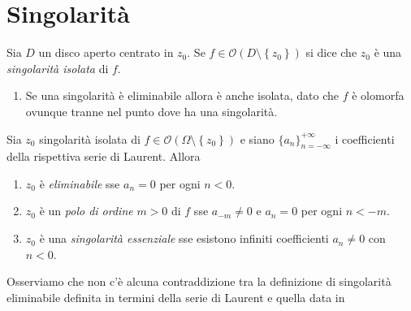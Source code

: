 \section{Singolarità}

\begin{definition}
  Sia $D$ un disco aperto centrato in $z_0$. Se $f \in \mathcal{O}(D \setminus
  \left\{ z_0 \right\})$ si dice che $z_0$ è una \emph{singolarità isolata} di
  $f$.
  \label{def:singolarità_isolata}
\end{definition}

\begin{example}
  \begin{enumerate}
    \item Se una singolarità è eliminabile allora è anche isolata, dato che $f$
      è olomorfa ovunque tranne nel punto dove ha una singolarità.
  \end{enumerate}
\end{example}

\begin{definition}
  Sia $z_0$ singolarità isolata di $f \in \mathcal{O}(\Omega \setminus \left\{
  z_0 \right\})$ e siano $\{a_n\}_{n=-\infty}^{+\infty}$ i coefficienti della
  rispettiva serie di Laurent. Allora
  \begin{enumerate}
    \item $z_0$ è \emph{eliminabile} sse $a_n = 0$ per ogni $n < 0$.
    \item $z_0$ è un \emph{polo di ordine} $m > 0$ di $f$ sse $a_{-m} \neq 0$ e $a_n
      = 0$ per ogni $n < -m$.
    \item $z_0$ è una \emph{singolarità essenziale} sse esistono infiniti coefficienti
      $a_n \neq 0$ con $n < 0$.
  \end{enumerate}
  \label{def:classificazione_singolarita_per_serie_di_laurent}
\end{definition}

\begin{remark}
  Osserviamo che non c'è alcuna contraddizione tra la definizione di singolarità
  eliminabile definita in termini della serie di Laurent e quella data in
  \label{rmk:equivalenza_definizioni_sing_eliminabili}
\end{remark}

